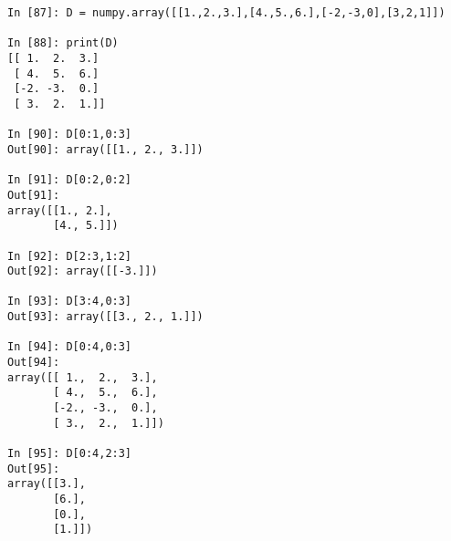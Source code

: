 \begin{center}
        \begin{verbatim}
In [87]: D = numpy.array([[1.,2.,3.],[4.,5.,6.],[-2,-3,0],[3,2,1]])

In [88]: print(D)
[[ 1.  2.  3.]
 [ 4.  5.  6.]
 [-2. -3.  0.]
 [ 3.  2.  1.]]

In [90]: D[0:1,0:3]
Out[90]: array([[1., 2., 3.]])

In [91]: D[0:2,0:2]
Out[91]: 
array([[1., 2.],
       [4., 5.]])

In [92]: D[2:3,1:2]
Out[92]: array([[-3.]])

In [93]: D[3:4,0:3]
Out[93]: array([[3., 2., 1.]])

In [94]: D[0:4,0:3]
Out[94]: 
array([[ 1.,  2.,  3.],
       [ 4.,  5.,  6.],
       [-2., -3.,  0.],
       [ 3.,  2.,  1.]])

In [95]: D[0:4,2:3]
Out[95]: 
array([[3.],
       [6.],
       [0.],
       [1.]])
       \end{verbatim}
\end{center}

